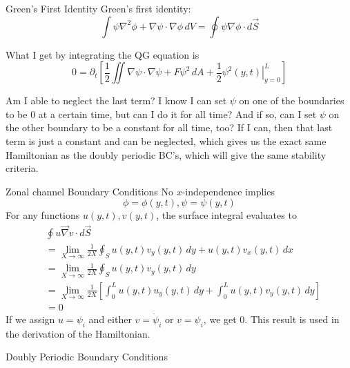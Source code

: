 \documentclass[12pt]{article}
\begin{document}
    \begin{section}{Green's First Identity}
        Green's first identity:
        $$
        \int \psi \nabla^2 \phi + \nabla \psi \cdot \nabla \phi \, dV = \oint \psi \nabla \phi \cdot d \vec S
        $$

        What I get by integrating the QG equation is
        $$
            0= \partial_t \left[ \frac12 \iint \nabla\psi\cdot\nabla\psi + F\psi^2 \, dA + \frac12 \left. \psi^2(y,t) \right|_{y=0}^L \right]
        $$

        Am I able to neglect the last term? I know I can set $\psi$ on one of the boundaries to be 0 at a certain time, but can I do it for all time? And if so, can I set $\psi$ on the other boundary to be a constant for all time, too? If I can, then that last term is just a constant and can be neglected, which gives us the exact same Hamiltonian as the doubly periodic BC's, which will give the same stability criteria.
    \end{section}

\newpage
\begin{section}{Zonal channel Boundary Conditions}
    No $x$-independence implies
    $$
        \phi = \phi(y, t), \psi = \psi(y, t)
    $$
    For any functions $u(y,t), v(y,t)$, the surface integral evaluates to
    \begin{align*}
        &\oint u \vec\nabla v \cdot d\vec S \\
        &= \lim_{X \rightarrow \infty} \frac{1}{2X} \oint_S u(y,t) v_y(y,t) \, dy + u(y,t) v_x(y,t) \, dx \\
        &= \lim_{X \rightarrow \infty} \frac{1}{2X} \oint_S u(y,t) v_y(y,t) \, dy \\
        &= \lim_{X \rightarrow \infty} \frac{1}{2X} \left[ \int_0^L u(y,t)u_y(y,t) \, dy + \int_0^L u(y,t)v_y(y,t) \, dy \right] \\
        &= 0
    \end{align*}
    If we assign $u = \psi_i$ and either $v = \dot\psi_i$ or $v = \psi_i$, we get 0. This result is used in the derivation of the Hamiltonian.
\end{section}

\newpage
\begin{section}{Doubly Periodic Boundary Conditions}
\end{section}
\end{document}

